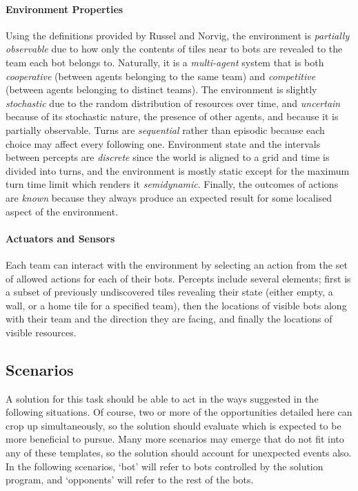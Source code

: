 \documentclass[a4paper,10pt]{article}
\begin{document}
\paragraph{Environment Properties}
Using the definitions provided by Russel and Norvig\cite{norvig10}, the environment is \emph{partially observable} due to how only the contents of tiles near to bots are revealed to the team each bot belongs to. Naturally, it is a \emph{multi-agent} system that is both \emph{cooperative} (between agents belonging to the same team) and \emph{competitive} (between agents belonging to distinct teams). The environment is slightly \emph{stochastic} due to the random distribution of resources over time, and \emph{uncertain} because of its stochastic nature, the presence of other agents, and because it is partially observable. Turns are \emph{sequential} rather than episodic because each choice may affect every following one. Environment state and the intervals between percepts are \emph{discrete} since the world is aligned to a grid and time is divided into turns, and the environment is mostly static except for the maximum turn time limit which renders it \emph{semidynamic}. Finally, the outcomes of actions are \emph{known} because they always produce an expected result for some localised aspect of the environment.

\paragraph{Actuators and Sensors}
Each team can interact with the environment by selecting an action from the set of allowed actions for each of their bots. Percepts include several elements; first is a subset of previously undiscovered tiles revealing their state (either empty, a wall, or a home tile for a specified team), then the locations of visible bots along with their team and the direction they are facing, and finally the locations of visible resources.

\subsection{Scenarios}
A solution for this task should be able to act in the ways suggested in the following situations. Of course, two or more of the opportunities detailed here can crop up simultaneously, so the solution should evaluate which is expected to be more beneficial to pursue. Many more scenarios may emerge that do not fit into any of these templates, so the solution should account for unexpected events also. In the following scenarios, `bot' will refer to bots controlled by the solution program, and `opponents' will refer to the rest of the bots.
\end{document}
